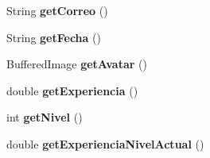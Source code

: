 \begin{DoxyCompactItemize}
String {\bfseries get\+Correo} ()
\item 
\mbox{\label{classmodelo_1_1_usuario_a53b65f7ac848e7bb2c95e55afc019a8b}} 
String {\bfseries get\+Fecha} ()
\item 
\mbox{\label{classmodelo_1_1_usuario_a914cdcd3dde8caf9dc05dbdad149d442}} 
Buffered\+Image {\bfseries get\+Avatar} ()
\item 
\mbox{\label{classmodelo_1_1_usuario_a2e22270ab079a28f765c652d46620fdd}} 
double {\bfseries get\+Experiencia} ()
\item 
\mbox{\label{classmodelo_1_1_usuario_a74dd866bd4b30e971af4488672eff042}} 
int {\bfseries get\+Nivel} ()
\item 
\mbox{\label{classmodelo_1_1_usuario_af26b4b82bc86a2a3d41fdd722da0a2c3}} 
double {\bfseries get\+Experiencia\+Nivel\+Actual} ()
\end{DoxyCompactItemize}
